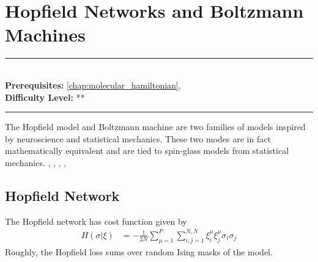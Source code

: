 \documentclass[book.tex]{subfiles}
\begin{document}
\chapter{Hopfield Networks and Boltzmann Machines}
\label{chap:hopfield}
\noindent\rule{11cm}{0.4pt} \\
\textbf{Prerequisites:}  \autoref{chap:molecular_hamiltonian},   \\
\textbf{Difficulty Level:} ** \\
\noindent\rule{11cm}{0.4pt}
\vspace{5mm}

The Hopfield model and Boltzmann machine are two families of models inspired by neuroscience and statistical mechanics. These two modes are in fact mathematically equivalent and are tied to spin-glass models from statistical mechanics. \cite{leonelli2021effective}, \cite{agliari2020generalized}, \cite{agliari2020neural}, \cite{agliari2020tolerance}, \cite{fachechi2019dreaming}

\section{Hopfield Network}

The Hopfield network has cost function given by
\begin{align}
H(\sigma| \xi) &= -\frac{1}{2N} \sum_{\mu=1}^P \sum_{i,j=1}^{N,N}\xi^\mu_i \xi^\mu_j \sigma_i \sigma_j
\end{align}
Roughly, the Hopfield loss sums over random Ising masks of the model.


\end{document}
